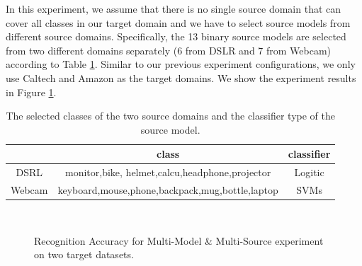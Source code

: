 In this experiment, we assume that there is no single source domain that can cover all classes in our target domain and we have to select source models from different source domains. Specifically, the 13 binary source models are selected from two different domains separately (6 from DSLR and 7 from Webcam) according to Table \ref{tab:class_gen}. Similar to our previous experiment configurations, we only use Caltech and Amazon as the target domains. We show the experiment results in Figure \ref{fig:exp2}.
\begin{table}[htbp]
	\centering
	\caption{The selected classes of the two source domains and the classifier type of the source model.}
	\begin{tabular}{|c|c|c|}
		\hline
		& class & classifier\\
		\hline
		DSRL& monitor,bike, helmet,calcu,headphone,projector & Logitic\\\hline
		Webcam&keyboard,mouse,phone,backpack,mug,bottle,laptop&SVMs\\ \hline
		
	\end{tabular}%
	\label{tab:class_gen}%
\end{table}%
\begin{figure}[th]
	\centering
	\qquad\qquad
	\\
	\caption{Recognition Accuracy for Multi-Model \& Multi-Source experiment on two target datasets. }
	\label{fig:exp2}
\end{figure}

